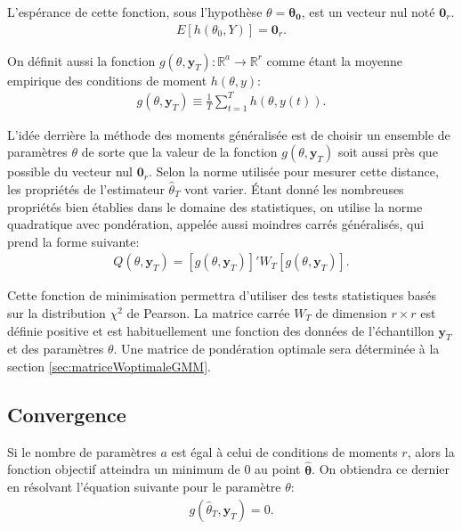 L'espérance de cette fonction, sous l'hypothèse $\theta =
\mathbf{\theta_0}$, est un vecteur nul noté $\mathbf{0}_r$.
\begin{align}
  E \left[h\left(\theta_0,Y \right) \right] = \mathbf{0}_r.
\end{align}

On définit aussi la fonction $g(\theta,\mathbf{y}_{T}):\mathbb{R}^a
\longrightarrow \mathbb{R}^r$ comme étant la moyenne empirique des
conditions de moment $h\left(\theta,y \right)$:
\begin{align}
  \label{eq:estimateurfonctiongh}
  g(\theta,\mathbf{y}_{T}) \equiv \frac{1}{T} \sum_{t=1}^T
  h\left(\theta,y(t) \right).
\end{align}

L’idée derrière la méthode des moments généralisée est de choisir un
ensemble de paramètres $\theta$ de sorte que la valeur de la fonction
$g(\theta,\mathbf{y}_{T})$ soit aussi près que possible du vecteur nul
$\mathbf{0}_r$. Selon la norme utilisée pour mesurer cette distance,
les propriétés de l'estimateur $\hat{\theta}_T$ vont varier. Étant
donné les nombreuses propriétés bien établies dans le domaine des
statistiques, on utilise la norme quadratique avec pondération,
appelée aussi moindres carrés généralisés, qui prend la forme
suivante:
\begin{align}
  \label{eq:objectifGMM1}
  Q(\theta,\mathbf{y}_{T}) = \left[g(\theta,\mathbf{y}_{T}) \right]'
  W_T \left[g(\theta,\mathbf{y}_{T}) \right].
\end{align}

Cette fonction de minimisation permettra d'utiliser des tests
statistiques basés sur la distribution $\chi^2$ de Pearson. La matrice
carrée $W_T$ de dimension $r\times r$ est définie positive et est
habituellement une fonction des données de l'échantillon
$\mathbf{y}_{T}$ et des paramètres $\theta$. Une matrice de
pondération optimale sera déterminée à la section
\ref{sec:matriceWoptimaleGMM}.

\subsection{Convergence}
\label{sec:convergenceGMM}

Si le nombre de paramètres $a$ est égal à celui de conditions de
moments $r$, alors la fonction objectif atteindra un minimum de 0 au
point $\mathbf{\hat\theta}$. On obtiendra ce dernier en résolvant
l'équation suivante pour le paramètre $\theta$:
\begin{align}
  g(\hat\theta_T,\mathbf{y}_{T})=0. \label{eq:paramegalecondmomentsGMM}
\end{align}

